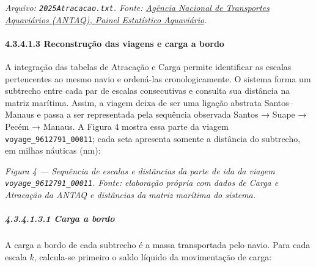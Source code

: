\documentclass[brazil,]{article}
\let\oldparagraph\paragraph
\renewcommand{\paragraph}[1]{\Needspace{7\baselineskip}\oldparagraph{#1}\mbox{}}
\let\oldsubparagraph\subparagraph
\renewcommand{\subparagraph}[1]{\Needspace{6\baselineskip}\oldsubparagraph{#1}\mbox{}}
\begin{document}
\emph{Arquivo: \texttt{2025Atracacao.txt}. Fonte:
\href{https://estatistica.antaq.gov.br/ea/sense/download.html}{Agência
Nacional de Transportes Aquaviários (ANTAQ), Painel Estatístico
Aquaviário}.}

\hypertarget{reconstruuxe7uxe3o-das-viagens}{%
\paragraph{4.3.4.1.3 Reconstrução das viagens e carga a
bordo}\label{reconstruuxe7uxe3o-das-viagens}}

A integração das tabelas de Atracação e Carga permite identificar as
escalas pertencentes ao mesmo navio e ordená-las cronologicamente. O
sistema forma um subtrecho entre cada par de escalas consecutivas e
consulta sua distância na matriz marítima. Assim, a viagem deixa de ser
uma ligação abstrata Santos--Manaus e passa a ser representada pela
sequência observada Santos → Suape → Pecém → Manaus. A Figura 4 mostra
essa parte da viagem \texttt{voyage\_9612791\_00011}; cada seta apresenta
somente a distância do subtrecho, em milhas náuticas (nm):

\begin{center}
\end{center}

\emph{Figura 4 --- Sequência de escalas e distâncias da parte de ida da
viagem \texttt{voyage\_9612791\_00011}. Fonte: elaboração própria com
dados de Carga e Atracação da ANTAQ e distâncias da matriz marítima do
sistema.}

\clearpage
\hypertarget{carga-a-bordo}{%
\subparagraph{4.3.4.1.3.1 Carga a bordo}\label{carga-a-bordo}}

A carga a bordo de cada subtrecho é a massa transportada pelo navio. Para
cada escala \(k\), calcula-se primeiro o saldo líquido da movimentação de
carga:
\end{document}
